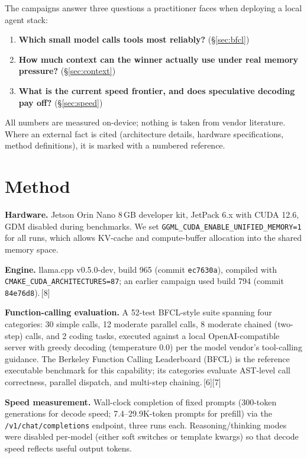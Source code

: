 \documentclass[10pt]{article}
\begin{document}
The campaigns answer three questions a practitioner faces when deploying a
local agent stack:
\begin{enumerate}
\item \textbf{Which small model calls tools most reliably?} (\S\ref{sec:bfcl})
\item \textbf{How much context can the winner actually use under real memory pressure?} (\S\ref{sec:context})
\item \textbf{What is the current speed frontier, and does speculative decoding pay off?} (\S\ref{sec:speed})
\end{enumerate}
All numbers are measured on-device; nothing is taken from vendor
literature. Where an external fact is cited (architecture details, hardware
specifications, method definitions), it is marked with a numbered
reference.

\section{Method}
\label{sec:method}
\textbf{Hardware.} Jetson Orin Nano 8\,GB developer kit, JetPack 6.x with
CUDA 12.6, GDM disabled during benchmarks. We set
\texttt{GGML\_CUDA\_ENABLE\_UNIFIED\_MEMORY=1} for all runs, which allows
KV-cache and compute-buffer allocation into the shared memory space.

\textbf{Engine.} llama.cpp v0.5.0-dev, build 965 (commit \texttt{ec7630a}),
compiled with \texttt{CMAKE\_CUDA\_ARCHITECTURES=87}; an earlier campaign
used build 794 (commit \texttt{84e76d8}).\,[8]

\textbf{Function-calling evaluation.} A 52-test BFCL-style suite spanning
four categories: 30 simple calls, 12 moderate parallel calls, 8 moderate
chained (two-step) calls, and 2 coding tasks, executed against a local
OpenAI-compatible server with greedy decoding (temperature 0.0) per the
model vendor's tool-calling guidance. The Berkeley Function Calling
Leaderboard (BFCL) is the reference executable benchmark for this
capability; its categories evaluate AST-level call correctness, parallel
dispatch, and multi-step chaining.\,[6][7]

\textbf{Speed measurement.} Wall-clock completion of fixed prompts
(300-token generations for decode speed; 7.4--29.9K-token prompts for
prefill) via the \texttt{/v1/chat/completions} endpoint, three runs each.
Reasoning/thinking modes were disabled per-model (either soft switches or
template kwargs) so that decode speed reflects useful output tokens.
\end{document}
